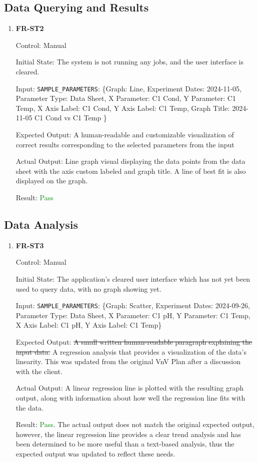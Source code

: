 \documentclass[12pt, titlepage]{article}
\begin{document}
\subsection{Data Querying and Results}
\begin{enumerate}
\item{\textbf{FR-ST2}} \label{FR:ST2}

Control: Manual

Initial State: The system is not running any jobs, and the user interface is
cleared.

Input: \texttt{SAMPLE\_PARAMETERS}: \{Graph: Line, Experiment Dates: 2024-11-05,
Parameter Type: Data Sheet, X Parameter: C1 Cond, Y Parameter: C1 Temp, X Axis
Label: C1 Cond, Y Axis Label: C1 Temp, Graph Title: 2024-11-05 C1 Cond vs C1
Temp \}

Expected Output: A human-readable and customizable visualization of correct
results corresponding to the selected parameters from the input

Actual Output: Line graph visual displaying the data points from the data sheet
with the axis custom labeled and graph title. A line of best fit is also
displayed on the graph.

Result: \textcolor{green}{Pass}
\end{enumerate}

\subsection{Data Analysis}
\begin{enumerate}
\item{\textbf{FR-ST3}} \label{FR:ST3}

Control: Manual

Initial State: The application's cleared user interface which has not yet been
used to query data, with no graph showing yet.

Input: \texttt{SAMPLE\_PARAMETERS}: \{Graph: Scatter, Experiment Dates:
2024-09-26, Parameter Type: Data Sheet, X Parameter: C1 pH, Y Parameter: C1
Temp, X Axis Label: C1 pH, Y Axis Label: C1 Temp\}

Expected Output: \st{A small written human-readable paragraph explaining the
input data.} A regression analysis that provides a visualization of the data's
linearity. This was updated from the original VnV Plan after a discussion with
the client.

Actual Output: A linear regression line is plotted with the resulting graph
output, along with information about how well the regression line fits with the
data.

Result: \textcolor{green}{Pass}. The actual output does not match the original
expected output, however, the linear regression line provides a clear trend
analysis and has been determined to be more useful than a text-based analysis,
thus the expected output was updated to reflect these needs.
\end{enumerate}
\end{document}
